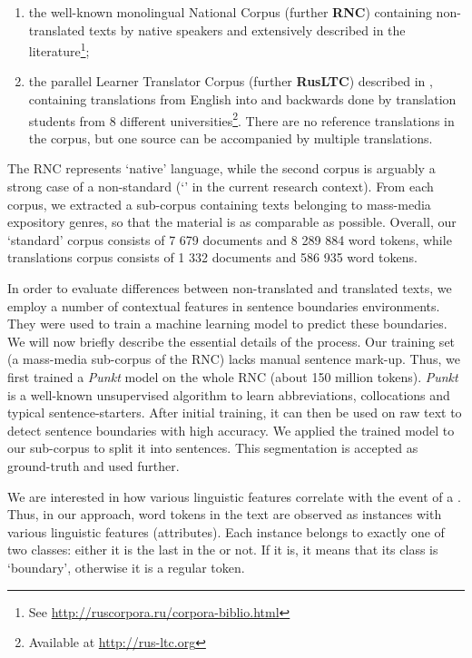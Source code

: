 \documentclass[output=paper]{langsci/langscibook.cls}
\begin{document}
\begin{enumerate}
\item the well-known monolingual  National Corpus (further \textbf{RNC}) containing non-translated texts by native  speakers and extensively described in the literature\footnote{See \url{http://ruscorpora.ru/corpora-biblio.html}};
\item the parallel  Learner Translator Corpus (further \textbf{RusLTC}) described in \citet{Kutuzov:2014}, containing translations from English into  and backwards done by  translation students from 8 different universities\footnote{Available at \url{http://rus-ltc.org}}. There are no reference translations in the corpus, but one source can be accompanied by multiple translations.
\end{enumerate}
The RNC represents `native'  language, while the second corpus is arguably a strong case of a non-standard  (`' in the current research context). From each corpus, we extracted a sub-corpus containing texts belonging to mass-media expository genres, so that the material is as comparable as possible. Overall, our `standard' corpus consists of 7 679 documents and 8 289 884 word tokens, while translations corpus consists of 1 332 documents and 586 935 word tokens. 

In order to evaluate differences between non-translated and translated texts, we employ a number of contextual features in sentence boundaries environments. They were used to train a machine learning model to predict these boundaries. We will now briefly describe the essential details of the process. Our training set (a mass-media sub-corpus of the RNC) lacks manual sentence mark-up. Thus, we first trained a \textit{Punkt} model on the whole RNC (about 150 million tokens). \textit{Punkt} \citep{Kiss:2006} is a well-known unsupervised algorithm to learn abbreviations, collocations and typical sentence-starters. After initial training, it can then be used on raw text to detect sentence boundaries with high accuracy. We applied the trained model to our sub-corpus to split it into sentences. This segmentation is accepted as ground-truth and used further.

We are interested in how various linguistic features correlate with the event of a . Thus, in our approach, word tokens in the text are observed as instances with various linguistic features (attributes). Each instance belongs to exactly one of two classes: either it is the last in the  or not. If it is, it means that its class is `boundary', otherwise it is a regular token.
\end{document}
